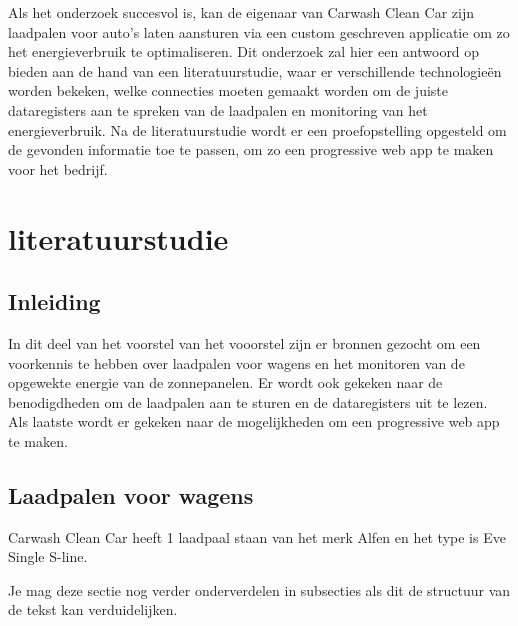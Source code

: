 Als het onderzoek succesvol is, kan de eigenaar van Carwash Clean Car zijn laadpalen voor auto's laten aansturen via een custom geschreven applicatie om zo het energieverbruik te optimaliseren. Dit onderzoek zal hier een antwoord op bieden aan de hand van een literatuurstudie, waar er verschillende technologieën worden bekeken, welke connecties moeten gemaakt worden om de juiste dataregisters aan te spreken van de laadpalen en monitoring van het energieverbruik. Na de literatuurstudie wordt er een proefopstelling opgesteld om de gevonden informatie toe te passen, om zo een progressive web app te maken voor het bedrijf.


\section{literatuurstudie}%
\label{sec:literatuurstudie}

\subsection{Inleiding}%
\label{sub:inleiding_literatuurstudie}
In dit deel van het voorstel van het vooorstel zijn er bronnen gezocht om een voorkennis te hebben over laadpalen voor wagens en het monitoren van de opgewekte energie van de zonnepanelen. Er wordt ook gekeken naar de benodigdheden om de laadpalen aan te sturen en de dataregisters uit te lezen. Als laatste wordt er gekeken naar de mogelijkheden om een progressive web app te maken.

\subsection{Laadpalen voor wagens}%
\label{sub:laadpalen_voor_wagens}
Carwash Clean Car heeft 1 laadpaal staan van het merk Alfen en het type is Eve Single S-line. 


Je mag deze sectie nog verder onderverdelen in subsecties als dit de structuur van de tekst kan verduidelijken.

